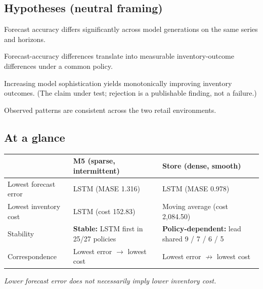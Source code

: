 \subsection*{Hypotheses (neutral framing)}
\begin{description}[leftmargin=!,labelwidth=2.2cm]
\item[H1.] Forecast accuracy differs significantly across model generations on
the same series and horizons.
\item[H2.] Forecast-accuracy differences translate into measurable
inventory-outcome differences under a common policy.
\item[H3.] Increasing model sophistication yields monotonically improving
inventory outcomes. (The claim under test; rejection is a publishable
finding, not a failure.)
\item[H4.] Observed patterns are consistent across the two retail environments.
\end{description}

\subsection*{At a glance}
\begin{center}
\begin{tabular}{p{3.2cm}p{5.4cm}p{5.4cm}}
\toprule
 & \textbf{M5 (sparse, intermittent)} & \textbf{Store (dense, smooth)} \\
\midrule
Lowest forecast error & LSTM (MASE 1.316) & LSTM (MASE 0.978) \\
Lowest inventory cost & LSTM (cost 152.83) & Moving average (cost 2,084.50) \\
Stability & \textbf{Stable:} LSTM first in 25/27 policies & \textbf{Policy-dependent:} lead shared 9 / 7 / 6 / 5 \\
Correspondence & Lowest error $\rightarrow$ lowest cost & Lowest error $\not\rightarrow$ lowest cost \\
\bottomrule
\end{tabular}
\end{center}
\begin{center}
\emph{Lower forecast error does not necessarily imply lower inventory cost.}
\end{center}
